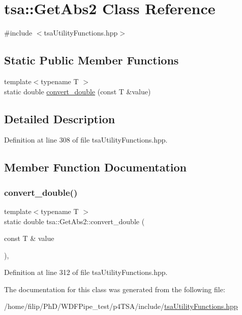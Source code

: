 \hypertarget{classtsa_1_1_get_abs2}{}\section{tsa\+:\+:Get\+Abs2 Class Reference}
\label{classtsa_1_1_get_abs2}


{\ttfamily \#include $<$tsa\+Utility\+Functions.\+hpp$>$}

\subsection*{Static Public Member Functions}
\begin{DoxyCompactItemize}
\item 
{\footnotesize template$<$typename T $>$ }\\static double \hyperlink{classtsa_1_1_get_abs2_a318574610c30dad787e395be7ad55baf}{convert\+\_\+double} (const T \&value)
\end{DoxyCompactItemize}


\subsection{Detailed Description}


Definition at line 308 of file tsa\+Utility\+Functions.\+hpp.



\subsection{Member Function Documentation}
\mbox{\label{classtsa_1_1_get_abs2_a318574610c30dad787e395be7ad55baf}} 
\subsubsection{\texorpdfstring{convert\+\_\+double()}{convert\_double()}}
{\footnotesize\ttfamily template$<$typename T $>$ \\
static double tsa\+::\+Get\+Abs2\+::convert\+\_\+double (\begin{DoxyParamCaption}\item[{const T \&}]{value }\end{DoxyParamCaption})\hspace{0.3cm}{\ttfamily [inline]}, {\ttfamily [static]}}



Definition at line 312 of file tsa\+Utility\+Functions.\+hpp.



The documentation for this class was generated from the following file\+:\begin{DoxyCompactItemize}
\item 
/home/filip/\+Ph\+D/\+W\+D\+F\+Pipe\+\_\+test/p4\+T\+S\+A/include/\hyperlink{tsa_utility_functions_8hpp}{tsa\+Utility\+Functions.\+hpp}\end{DoxyCompactItemize}
